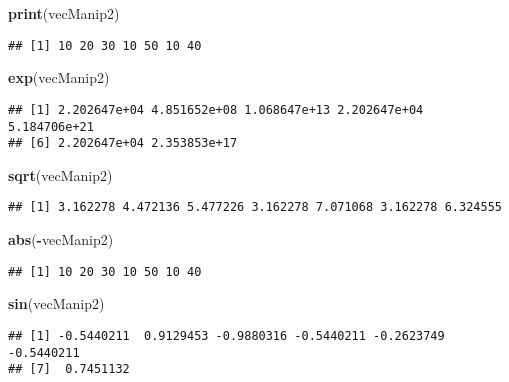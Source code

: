 \documentclass[]{book}
\newenvironment{Shaded}{\begin{snugshade}}{\end{snugshade}}
\newcommand{\KeywordTok}[1]{\textcolor[rgb]{0.13,0.29,0.53}{\textbf{#1}}}
\newcommand{\OperatorTok}[1]{\textcolor[rgb]{0.81,0.36,0.00}{\textbf{#1}}}
\newcommand{\NormalTok}[1]{#1}
\theoremstyle{definition}
\theoremstyle{definition}
\theoremstyle{definition}
\theoremstyle{remark}
\begin{document}
\begin{Shaded}
\begin{Highlighting}[]
\KeywordTok{print}\NormalTok{(vecManip2)}
\end{Highlighting}
\end{Shaded}

\begin{verbatim}
## [1] 10 20 30 10 50 10 40
\end{verbatim}

\begin{Shaded}
\begin{Highlighting}[]
\KeywordTok{exp}\NormalTok{(vecManip2)}
\end{Highlighting}
\end{Shaded}

\begin{verbatim}
## [1] 2.202647e+04 4.851652e+08 1.068647e+13 2.202647e+04 5.184706e+21
## [6] 2.202647e+04 2.353853e+17
\end{verbatim}

\begin{Shaded}
\begin{Highlighting}[]
\KeywordTok{sqrt}\NormalTok{(vecManip2)}
\end{Highlighting}
\end{Shaded}

\begin{verbatim}
## [1] 3.162278 4.472136 5.477226 3.162278 7.071068 3.162278 6.324555
\end{verbatim}

\begin{Shaded}
\begin{Highlighting}[]
\KeywordTok{abs}\NormalTok{(}\OperatorTok{-}\NormalTok{vecManip2)}
\end{Highlighting}
\end{Shaded}

\begin{verbatim}
## [1] 10 20 30 10 50 10 40
\end{verbatim}

\begin{Shaded}
\begin{Highlighting}[]
\KeywordTok{sin}\NormalTok{(vecManip2)}
\end{Highlighting}
\end{Shaded}

\begin{verbatim}
## [1] -0.5440211  0.9129453 -0.9880316 -0.5440211 -0.2623749 -0.5440211
## [7]  0.7451132
\end{verbatim}
\end{document}
